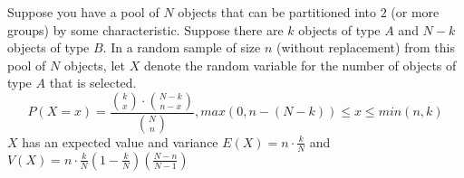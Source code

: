 \begin{definition}
    Suppose you have a pool of $N$ objects that can be partitioned into $2$ (or more groups) by some characteristic. Suppose there are $k$ objects of type $A$ and $N - k$ objects of type $B$. In a random sample of size $n$ (without replacement) from this pool of $N$ objects, let $X$ denote the random variable for the number of objects of type $A$ that is selected. $$P(X = x) = \frac{\binom{k}{x} \cdot \binom{N-k}{n-x}}{\binom{N}{n}}, max(0, n - (N-k)) \le x \le min(n, k)$$
    $X$ has an expected value and variance $E(X) = n \cdot \frac{k}{N}$ and $V(X) = n \cdot \frac{k}{N} \left( 1 - \frac{k}{N} \right) \left( \frac{N - n}{N - 1} \right)$
\end{definition}